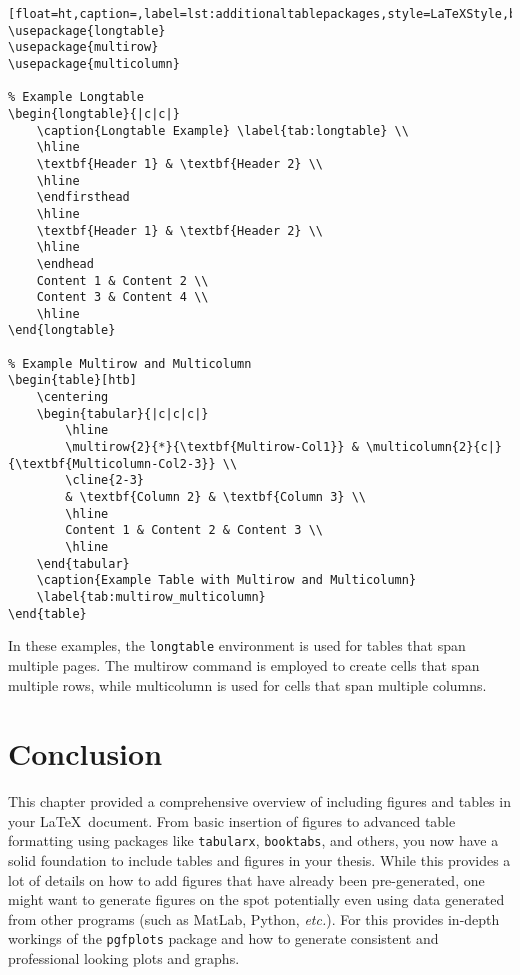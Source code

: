 		\begin{lstlisting}[float=ht,caption=,label=lst:additionaltablepackages,style=LaTeXStyle,basicstyle=\small\ttfamily,]
\usepackage{longtable}
\usepackage{multirow}
\usepackage{multicolumn}

% Example Longtable
\begin{longtable}{|c|c|}
	\caption{Longtable Example} \label{tab:longtable} \\
	\hline
	\textbf{Header 1} & \textbf{Header 2} \\
	\hline
	\endfirsthead
	\hline
	\textbf{Header 1} & \textbf{Header 2} \\
	\hline
	\endhead
	Content 1 & Content 2 \\
	Content 3 & Content 4 \\
	\hline
\end{longtable}

% Example Multirow and Multicolumn
\begin{table}[htb]
	\centering
	\begin{tabular}{|c|c|c|}
		\hline
		\multirow{2}{*}{\textbf{Multirow-Col1}} & \multicolumn{2}{c|}{\textbf{Multicolumn-Col2-3}} \\
		\cline{2-3}
		& \textbf{Column 2} & \textbf{Column 3} \\
		\hline
		Content 1 & Content 2 & Content 3 \\
		\hline
	\end{tabular}
	\caption{Example Table with Multirow and Multicolumn}
	\label{tab:multirow_multicolumn}
\end{table}
		\end{lstlisting}

		In these examples, the \texttt{longtable} environment is used for tables that span multiple pages. 
		The multirow command is employed to create cells that span multiple rows, while multicolumn is used for cells that span multiple columns.

	\section{Conclusion}
		This chapter provided a comprehensive overview of including figures and tables in your \LaTeX\ document. 
		From basic insertion of figures to advanced table formatting using packages like \texttt{tabularx}, \texttt{booktabs}, and others, you now have a solid foundation to include tables and figures in your thesis.
		While this provides a lot of details on how to add figures that have already been pre-generated, one might want to generate figures on the spot potentially even using data generated from other programs (such as MatLab\textsuperscript{\tiny\textregistered}, Python, \textit{etc.}).
		For this  provides in-depth workings of the \texttt{pgfplots} package and how to generate consistent and professional looking plots and graphs.

